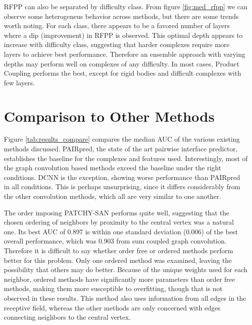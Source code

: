 RFPP can also be separated by difficulty class.
From figure \ref{fig:med_rfpp} we can observe some heterogeneus behavior across methods, but there are some trends worth noting.
For each class, there appears to be a favored number of layers where a dip (improvement) in RFPP is observed. 
This optimal depth appears to increase with difficulty class, suggesting that harder complexes require more layers to achieve best performance.
Therefore an ensemble approach with varying depths may perform well on complexes of any difficulty. 
In most cases, Product Coupling performs the best, except for rigid bodies and difficult complexes with few layers.



\section{Comparison to Other Methods}

Figure \ref{tab:results_compare} compares the median AUC of the various existing methods discussed.
PAIRpred, the state of the art pairwise interface predictor, establishes the baseline for the complexes and features used.
Interestingly, most of the graph convolution based methods exceed the baseline under the right conditions.
DCNN is the exception, showing worse performance than PAIRpred in all conditions.
This is perhaps unsurprising, since it differs considerably from the other convolution methods, which all are very similar to one another.

The order imposing PATCHY-SAN performs quite well, suggesting that the chosen ordering of neighbors by proximity to the central vertex was a natural one.
Its best AUC of 0.897 is within one standard deviation (0.006) of the best overall performance, which was 0.903 from sum coupled graph convolution.
Therefore it is difficult to say whether order free or ordered methods perform better for this problem.
Only one ordered method was examined, leaving the possibility that others may do better.
Because of the unique weights used for each neighbor, ordered methods have significantly more parameters than order free methods, making them more susceptible to overfitting, though that is not observed in these results.
This method also uses information from all edges in the receptive field, whereas the other methods are only concerned with edges connecting neighbors to the central vertex.

